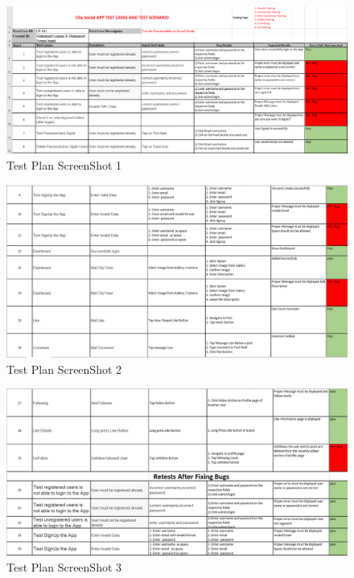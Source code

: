 \begin{figure}[!htb]
    \centering
    \includegraphics[scale=0.52]{testingshots/testplan1.PNG}
    \caption{Test Plan ScreenShot 1}
    \label{fig:Test Plan ScreenShot 1}
\end{figure}
\begin{figure}[!htb]
    \centering
    \includegraphics[scale=0.56]{testingshots/testplan2.PNG}
    \caption{Test Plan ScreenShot 2}
    \label{fig:Test Plan ScreenShot 2}
\end{figure}
\begin{figure}[!htb]
    \centering
    \includegraphics[scale=0.56]{testingshots/testplan3.PNG}
    \caption{Test Plan ScreenShot 3}
    \label{fig:Test Plan ScreenShot 3}
\end{figure}


